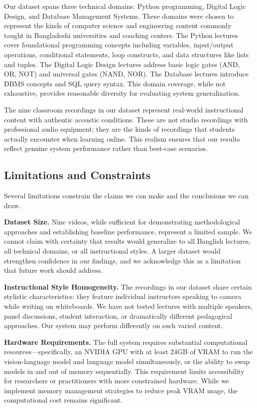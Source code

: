 Our dataset spans three technical domains: Python programming, Digital Logic Design, and Database Management Systems. These domains were chosen to represent the kinds of computer science and engineering content commonly taught in Bangladeshi universities and coaching centers. The Python lectures cover foundational programming concepts including variables, input/output operations, conditional statements, loop constructs, and data structures like lists and tuples. The Digital Logic Design lectures address basic logic gates (AND, OR, NOT) and universal gates (NAND, NOR). The Database lectures introduce DBMS concepts and SQL query syntax. This domain coverage, while not exhaustive, provides reasonable diversity for evaluating system generalization.

The nine classroom recordings in our dataset represent real-world instructional content with authentic acoustic conditions. These are not studio recordings with professional audio equipment; they are the kinds of recordings that students actually encounter when learning online. This realism ensures that our results reflect genuine system performance rather than best-case scenarios.

\subsection{Limitations and Constraints}

Several limitations constrain the claims we can make and the conclusions we can draw.

\textbf{Dataset Size.} Nine videos, while sufficient for demonstrating methodological approaches and establishing baseline performance, represent a limited sample. We cannot claim with certainty that results would generalize to all Banglish lectures, all technical domains, or all instructional styles. A larger dataset would strengthen confidence in our findings, and we acknowledge this as a limitation that future work should address.

\textbf{Instructional Style Homogeneity.} The recordings in our dataset share certain stylistic characteristics: they feature individual instructors speaking to camera while writing on whiteboards. We have not tested lectures with multiple speakers, panel discussions, student interaction, or dramatically different pedagogical approaches. Our system may perform differently on such varied content.

\textbf{Hardware Requirements.} The full system requires substantial computational resources---specifically, an NVIDIA GPU with at least 24GB of VRAM to run the vision-language model and language model simultaneously, or the ability to swap models in and out of memory sequentially. This requirement limits accessibility for researchers or practitioners with more constrained hardware. While we implement memory management strategies to reduce peak VRAM usage, the computational cost remains significant.

